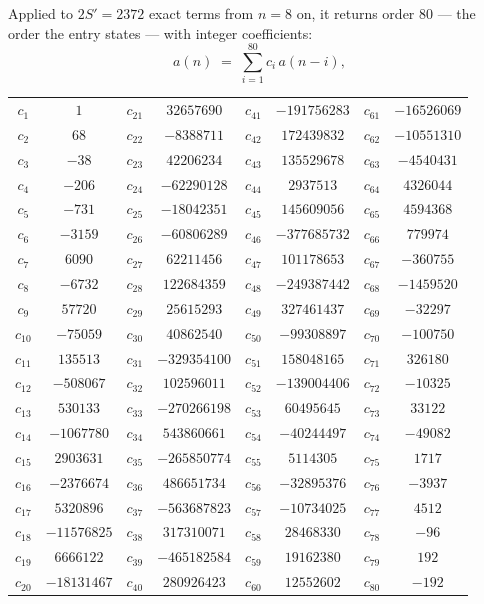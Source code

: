 \documentclass[11pt,a4paper]{article}
\theoremstyle{plain}
\theoremstyle{definition}
\begin{document}
Applied to $2S'=2372$ exact terms from $n=8$ on, it returns order $80$ --- the
order the entry states --- with integer coefficients:
\[
a(n)\;=\;\sum_{i=1}^{80}c_i\,a(n-i),
\]
\begin{center}\small
\begin{tabular}{cccccccc}
$c_{1}$ & $1$ & $c_{21}$ & $32657690$ & $c_{41}$ & $-191756283$ & $c_{61}$ & $-16526069$ \\
$c_{2}$ & $68$ & $c_{22}$ & $-8388711$ & $c_{42}$ & $172439832$ & $c_{62}$ & $-10551310$ \\
$c_{3}$ & $-38$ & $c_{23}$ & $42206234$ & $c_{43}$ & $135529678$ & $c_{63}$ & $-4540431$ \\
$c_{4}$ & $-206$ & $c_{24}$ & $-62290128$ & $c_{44}$ & $2937513$ & $c_{64}$ & $4326044$ \\
$c_{5}$ & $-731$ & $c_{25}$ & $-18042351$ & $c_{45}$ & $145609056$ & $c_{65}$ & $4594368$ \\
$c_{6}$ & $-3159$ & $c_{26}$ & $-60806289$ & $c_{46}$ & $-377685732$ & $c_{66}$ & $779974$ \\
$c_{7}$ & $6090$ & $c_{27}$ & $62211456$ & $c_{47}$ & $101178653$ & $c_{67}$ & $-360755$ \\
$c_{8}$ & $-6732$ & $c_{28}$ & $122684359$ & $c_{48}$ & $-249387442$ & $c_{68}$ & $-1459520$ \\
$c_{9}$ & $57720$ & $c_{29}$ & $25615293$ & $c_{49}$ & $327461437$ & $c_{69}$ & $-32297$ \\
$c_{10}$ & $-75059$ & $c_{30}$ & $40862540$ & $c_{50}$ & $-99308897$ & $c_{70}$ & $-100750$ \\
$c_{11}$ & $135513$ & $c_{31}$ & $-329354100$ & $c_{51}$ & $158048165$ & $c_{71}$ & $326180$ \\
$c_{12}$ & $-508067$ & $c_{32}$ & $102596011$ & $c_{52}$ & $-139004406$ & $c_{72}$ & $-10325$ \\
$c_{13}$ & $530133$ & $c_{33}$ & $-270266198$ & $c_{53}$ & $60495645$ & $c_{73}$ & $33122$ \\
$c_{14}$ & $-1067780$ & $c_{34}$ & $543860661$ & $c_{54}$ & $-40244497$ & $c_{74}$ & $-49082$ \\
$c_{15}$ & $2903631$ & $c_{35}$ & $-265850774$ & $c_{55}$ & $5114305$ & $c_{75}$ & $1717$ \\
$c_{16}$ & $-2376674$ & $c_{36}$ & $486651734$ & $c_{56}$ & $-32895376$ & $c_{76}$ & $-3937$ \\
$c_{17}$ & $5320896$ & $c_{37}$ & $-563687823$ & $c_{57}$ & $-10734025$ & $c_{77}$ & $4512$ \\
$c_{18}$ & $-11576825$ & $c_{38}$ & $317310071$ & $c_{58}$ & $28468330$ & $c_{78}$ & $-96$ \\
$c_{19}$ & $6666122$ & $c_{39}$ & $-465182584$ & $c_{59}$ & $19162380$ & $c_{79}$ & $192$ \\
$c_{20}$ & $-18131467$ & $c_{40}$ & $280926423$ & $c_{60}$ & $12552602$ & $c_{80}$ & $-192$ \\
\end{tabular}
\end{center}
\end{document}
